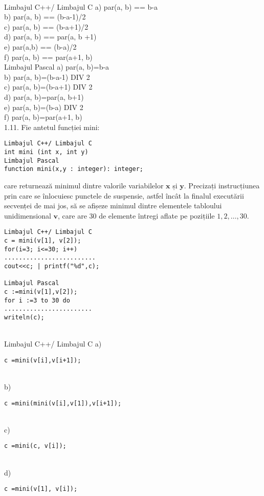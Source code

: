 \\
Limbajul C++/ Limbajul C
a) par(a, b) == b-a
\\
b) par(a, b) == (b-a-1)/2
\\
c) par(a, b) == (b-a+1)/2
\\
d) par(a, b) == par(a, b +1)
\\
e) par(a,b) == (b-a)/2
\\
f) par(a, b) == par(a+1, b)
\\
Limbajul Pascal
a) par(a, b)=b-a
\\
b) par(a, b)=(b-a-1) DIV 2
\\
c) par(a, b)=(b-a+1) DIV 2
\\
d) par(a, b)=par(a, b+1)
\\
e) par(a, b)=(b-a) DIV 2
\\
f) par(a, b)=par(a+1, b)
\\
1.11. Fie antetul funcției mini:
\begin{verbatim}
Limbajul C++/ Limbajul C
int mini (int x, int y)
Limbajul Pascal
function mini(x,y : integer): integer;
\end{verbatim}
care returnează minimul dintre valorile variabilelor $\mathbf{x}$ și $\mathbf{y}$. Precizați instrucțiunea prin care se înlocuiesc punctele de suspensie, astfel încât la finalul executării secvenței de mai jos, să se afișeze minimul dintre elementele tabloului unidimensional $\mathbf{v}$, care are 30 de elemente întregi aflate pe pozițiile $1,2, \ldots, 30$.
\begin{verbatim}
Limbajul C++/ Limbajul C
c = mini(v[1], v[2]);
for(i=3; i<=30; i++)
.........................
cout<<c; | printf("%d",c);

Limbajul Pascal
c :=mini(v[1],v[2]);
for i :=3 to 30 do
........................
writeln(c);
\end{verbatim}
\\
Limbajul C++/ Limbajul C
a) \begin{verbatim}
c =mini(v[i],v[i+1]);
\end{verbatim}
\\
b) \begin{verbatim}
c =mini(mini(v[i],v[1]),v[i+1]);
\end{verbatim}
\\
c) \begin{verbatim}
c =mini(c, v[i]);
\end{verbatim}
\\
d) \begin{verbatim}
c =mini(v[1], v[i]);
\end{verbatim}
